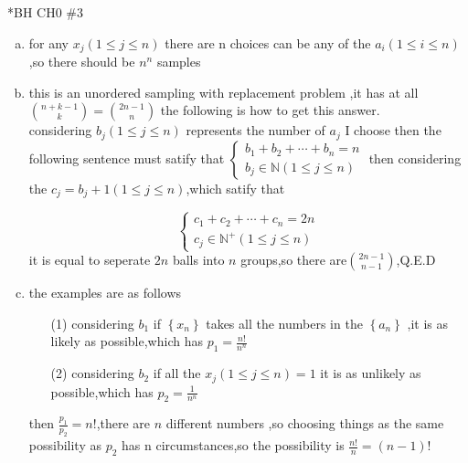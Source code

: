 \documentclass{article}
\begin{document}
\begin{homeworkProblem}*{BH CH0 \#3}
	\begin{enumerate}[(a)]
		\item for any $x_j (1\leq j\leq n)$ there are n choices can be any of the $a_i(1\leq i\leq n)$,so there should be $n^n$ samples
		\item this is an unordered sampling with replacement problem ,it has at all $\binom{n+k-1}{k}=\binom{2n-1}{n}$ the following is how to get this answer. 
		\\considering  $b_j(1\leq j\leq n)$ represents the number of $a_j$ I choose
		then the following sentence must satify that 
		$
		\begin{cases}
			b_1+b_2+\cdots+b_n=n\\
			b_j\in \mathbb{N}(1\leq j\leq n)
		\end{cases}
		$
	then considering the ${c_j}=b_j+1(1\leq j\leq n)$,which satify that
	
	$$
	\begin{cases}
		c_1+c_2+\cdots+c_n=2n\\
		c_j\in \mathbb{N^+}(1\leq j\leq n)
		\end{cases}
		$$
it is equal to seperate $2n$ balls into $n$ groups,so there are$\binom{2n-1}{n-1}$,Q.E.D
\item the examples are as follows
\begin{enumerate}
	\item[(1)]considering $b_1$ if $\left\{x_n\right\}$ takes all the numbers in the $\left\{a_n\right\}$ ,it is as likely as possible,which has $p_1=\frac{n!}{n^n}$
\item[(2)] considering $b_2$ if all the $x_j(1\leq j\leq n)=1$ it is as unlikely as possible,which has $p_2=\frac{1}{n^n}$
\end{enumerate}
then $\frac{p_1}{p_2}=n!$,there are $n$ different numbers ,so choosing things as the same possibility as $p_2$ has n circumstances,so the possibility is $\frac{n!}{n}=(n-1)!$
	\end{enumerate}
	
\end{homeworkProblem}
\end{document}
